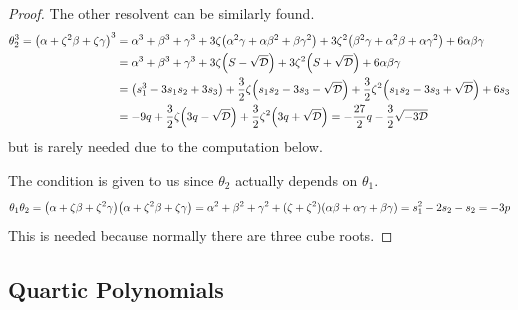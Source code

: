 \begin{proof}
    The other resolvent can be similarly found.
    \begin{align*}
        \theta_2^3 = \pqty{\alpha + \zeta^2\beta + \zeta\gamma}^3
        &= \alpha^3 + \beta^3 + \gamma^3 + 3\zeta\pqty{\alpha^2\gamma + \alpha\beta^2 + \beta\gamma^2}
        + 3\zeta^2\pqty{\beta^2\gamma + \alpha^2\beta + \alpha\gamma^2} + 6\alpha\beta\gamma \\
        &= \alpha^3 + \beta^3 + \gamma^3 + 3\zeta\pqty{S-\sqrt{\mca{D}}}
        + 3\zeta^2\pqty{S+\sqrt{\mca{D}}} + 6\alpha\beta\gamma \\
        &= \pqty{s_1^3 - 3s_1s_2 + 3s_3} + \frac{3}{2}\zeta\pqty{s_1s_2 - 3s_3 - \sqrt{\mca{D}}}
        + \frac{3}{2}\zeta^2\pqty{s_1s_2 - 3s_3 + \sqrt{\mca{D}}} + 6s_3 \\
        &= -9q + \frac{3}{2}\zeta\pqty{3q - \sqrt{\mca{D}}} + \frac{3}{2}\zeta^2\pqty{3q + \sqrt{\mca{D}}}
        = -\frac{27}{2}q - \frac{3}{2}\sqrt{-3\mca{D}}
    \end{align*}
    but is rarely needed due to the computation below.
    
    The condition is given to us since \(\theta_2\) actually depends on \(\theta_1\).
    \begin{equation*}
        \theta_1\theta_2 = \pqty{\alpha+\zeta\beta+\zeta^2\gamma}\pqty{\alpha+\zeta^2\beta+\zeta\gamma}
        = \alpha^2 + \beta^2 + \gamma^2 + (\zeta+\zeta^2)(\alpha\beta + \alpha\gamma + \beta\gamma)
        = s_1^2 - 2s_2 - s_2 = -3p
    \end{equation*}
    This is needed because normally there are three cube roots.
\end{proof}

\subsection*{Quartic Polynomials}



